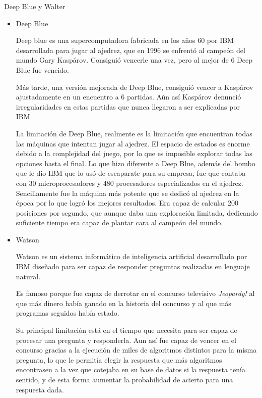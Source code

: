 \documentclass[spanish, a4paper, 12pt]{article} 	%
\begin{document}
\begin{section}{Deep Blue y Walter}
	\begin{itemize}
		\item{Deep Blue}
		
		  Deep blue es una supercomputadora fabricada en los años 60 por IBM desarrollada para jugar al ajedrez, que en 1996 se enfrentó al campeón del mundo Gary Kaspárov. Consiguió vencerle una vez, pero al mejor de 6 Deep Blue fue vencido.
	
	Más tarde, una versión mejorada de Deep Blue, consiguió vencer a Kaspárov ajustadamente en un encuentro a 6 partidas. Aún así Kaspárov denunció irregularidades en estas partidas que nunca llegaron a ser explicadas por IBM. 
	
	La limitación de Deep Blue, realmente es la limitación que encuentran todas las máquinas que intentan jugar al ajedrez. El espacio de estados es enorme debido a la complejidad del juego, por lo que es imposible explorar todas las opciones hasta el final. Lo que hizo diferente a Deep Blue, además del bombo que le dio IBM que lo usó de escaparate para su empresa, fue que contaba con 30  microprocesadores y 480 procesadores especializados en el ajedrez. Sencillamente fue la máquina más potente que se dedicó al ajedrez en la época por lo que logró los mejores resultados. Era capaz de calcular 200 posiciones por segundo, que aunque daba una exploración limitada, dedicando suficiente tiempo era capaz de plantar cara al campeón del mundo.
	
	
	
	\item{Watson}
	
	  Watson es un sistema informático de inteligencia artificial desarrollado por IBM diseñado para ser capaz de responder preguntas realizadas en lenguaje natural.
	
	Es famoso porque fue capaz de derrotar en el concurso televisivo \textit{Jeopardy!} al que más dinero había ganado en la historia del concurso y al que más programas seguidos había estado.
	
	Su principal limitación está en el tiempo que necesita para ser capaz de procesar una pregunta y responderla. Aun así fue capaz de vencer en el concurso gracias a la ejecución de miles de algoritmos distintos para la misma pregunta, lo que le permitía elegir la respuesta que más algoritmos encontrasen a la vez que cotejaba en su base de datos si la respuesta tenía sentido, y de esta forma aumentar la probabilidad de acierto para una respuesta dada. 
	\end{itemize}
\end{section}
\end{document}

